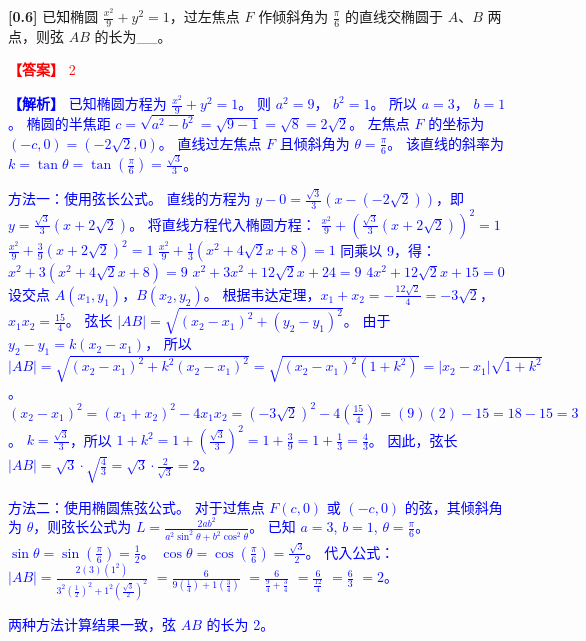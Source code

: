 \documentclass[varwidth=16cm, border=2mm]{standalone}
\begin{document}
\textbf{[0.6]} 已知椭圆 $\frac{x^2}{9} + y^2 = 1$，过左焦点 $F$ 作倾斜角为 $\frac{\pi}{6}$ 的直线交椭圆于 $A$、$B$ 两点，则弦 $AB$ 的长为__。

\vspace{0.2cm}\par\noindent\textcolor{red}{\textbf{【答案】} 2}
\par\noindent\textcolor{blue}{\textbf{【解析】} 已知椭圆方程为 $\frac{x^2}{9} + y^2 = 1$。
则 $a^2 = 9$， $b^2 = 1$。
所以 $a = 3$， $b = 1$。
椭圆的半焦距 $c = \sqrt{a^2 - b^2} = \sqrt{9 - 1} = \sqrt{8} = 2\sqrt{2}$。
左焦点 $F$ 的坐标为 $(-c, 0) = (-2\sqrt{2}, 0)$。
直线过左焦点 $F$ 且倾斜角为 $\theta = \frac{\pi}{6}$。
该直线的斜率为 $k = \tan\theta = \tan(\frac{\pi}{6}) = \frac{\sqrt{3}}{3}$。

方法一：使用弦长公式。
直线的方程为 $y - 0 = \frac{\sqrt{3}}{3}(x - (-2\sqrt{2}))$，即 $y = \frac{\sqrt{3}}{3}(x + 2\sqrt{2})$。
将直线方程代入椭圆方程：
$\frac{x^2}{9} + (\frac{\sqrt{3}}{3}(x + 2\sqrt{2}))^2 = 1$
$\frac{x^2}{9} + \frac{3}{9}(x + 2\sqrt{2})^2 = 1$
$\frac{x^2}{9} + \frac{1}{3}(x^2 + 4\sqrt{2}x + 8) = 1$
同乘以 9，得：
$x^2 + 3(x^2 + 4\sqrt{2}x + 8) = 9$
$x^2 + 3x^2 + 12\sqrt{2}x + 24 = 9$
$4x^2 + 12\sqrt{2}x + 15 = 0$
设交点 $A(x_1, y_1)$，$B(x_2, y_2)$。
根据韦达定理，$x_1 + x_2 = -\frac{12\sqrt{2}}{4} = -3\sqrt{2}$， $x_1x_2 = \frac{15}{4}$。
弦长 $|AB| = \sqrt{(x_2-x_1)^2 + (y_2-y_1)^2}$。
由于 $y_2 - y_1 = k(x_2 - x_1)$，
所以 $|AB| = \sqrt{(x_2-x_1)^2 + k^2(x_2-x_1)^2} = \sqrt{(x_2-x_1)^2(1+k^2)} = |x_2-x_1|\sqrt{1+k^2}$。
$(x_2-x_1)^2 = (x_1+x_2)^2 - 4x_1x_2 = (-3\sqrt{2})^2 - 4(\frac{15}{4}) = (9)(2) - 15 = 18 - 15 = 3$。
$k = \frac{\sqrt{3}}{3}$，所以 $1+k^2 = 1 + (\frac{\sqrt{3}}{3})^2 = 1 + \frac{3}{9} = 1 + \frac{1}{3} = \frac{4}{3}$。
因此，弦长 $|AB| = \sqrt{3} \cdot \sqrt{\frac{4}{3}} = \sqrt{3} \cdot \frac{2}{\sqrt{3}} = 2$。

方法二：使用椭圆焦弦公式。
对于过焦点 $F(c, 0)$ 或 $(-c, 0)$ 的弦，其倾斜角为 $\theta$，则弦长公式为 $L = \frac{2ab^2}{a^2\sin^2\theta + b^2\cos^2\theta}$。
已知 $a=3$, $b=1$, $\theta = \frac{\pi}{6}$。
$\sin\theta = \sin(\frac{\pi}{6}) = \frac{1}{2}$。
$\cos\theta = \cos(\frac{\pi}{6}) = \frac{\sqrt{3}}{2}$。
代入公式：
$|AB| = \frac{2(3)(1^2)}{3^2(\frac{1}{2})^2 + 1^2(\frac{\sqrt{3}}{2})^2}$
$= \frac{6}{9(\frac{1}{4}) + 1(\frac{3}{4})}$
$= \frac{6}{\frac{9}{4} + \frac{3}{4}}$
$= \frac{6}{\frac{12}{4}}$
$= \frac{6}{3}$
$= 2$。

两种方法计算结果一致，弦 $AB$ 的长为 2。}
\end{document}
